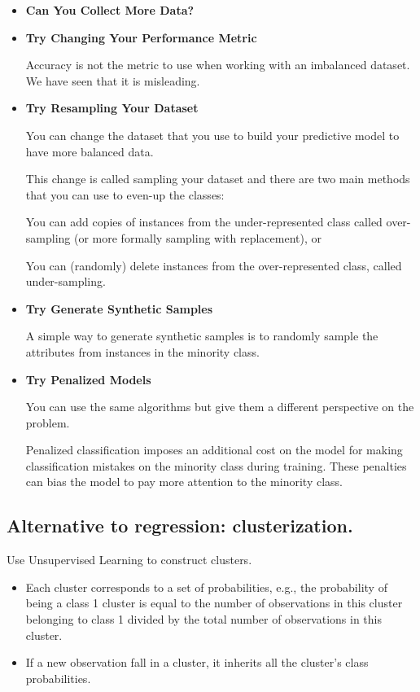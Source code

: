 \begin{itemize}
    \item \textbf{Can You Collect More Data?}
    \item \textbf{Try Changing Your Performance Metric}
          
          Accuracy is not the metric to use when working with an imbalanced dataset. We have seen that it is misleading.
    \item \textbf{Try Resampling Your Dataset}
          
          You can change the dataset that you use to build your predictive model to have more balanced data.
          
          This change is called sampling your dataset and there are two main methods that you can use to even-up the classes:
          
          You can add copies of instances from the under-represented class called over-sampling (or more formally sampling with replacement), or
          
          You can (randomly) delete instances from the over-represented class, called under-sampling.
    \item \textbf{Try Generate Synthetic Samples}
          
          A simple way to generate synthetic samples is to randomly sample the attributes from instances in the minority class.
    \item \textbf{Try Penalized Models}
          
          You can use the same algorithms but give them a different perspective on the problem.
          
          Penalized classification imposes an additional cost on the model for making classification mistakes on the minority class during training. These penalties can bias the model to pay more attention to the minority class.
\end{itemize}

\subsection{Alternative to regression: clusterization.}

Use Unsupervised Learning to construct clusters.
\begin{itemize}
    \item Each cluster corresponds to a set of probabilities, e.g., the probability of being a class 1 cluster is equal to the number of observations in this cluster belonging to class 1 divided by the total number of observations in this cluster.
    \item If a new observation fall in a cluster, it inherits all the cluster’s class probabilities.
\end{itemize}
